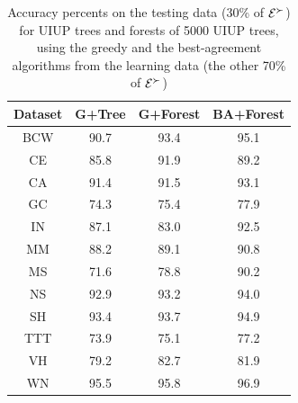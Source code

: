 {
	\begin{table}
	  \centering
	  \begin{tabular}{ |c||c|c|c| }
	    \hline
	    Dataset          & G+Tree & G+Forest & BA+Forest\\
	    \hline \hline
	    BCW              & 90.7   & 93.4     & 95.1 \\ \hline
	    CE               & 85.8   & 91.9     & 89.2 \\ \hline      
	    CA               & 91.4   & 91.5     & 93.1 \\ \hline       
	    GC               & 74.3   & 75.4     & 77.9 \\ \hline     
	    IN               & 87.1   & 83.0     & 92.5 \\ \hline   
	    MM               & 88.2   & 89.1     & 90.8 \\ \hline         
	    MS               & 71.6   & 78.8     & 90.2 \\ \hline 
	    NS               & 92.9   & 93.2     & 94.0 \\ \hline
	    SH               & 93.4   & 93.7     & 94.9 \\ \hline   
	    TTT              & 73.9   & 75.1     & 77.2 \\ \hline 
	    VH               & 79.2   & 82.7     & 81.9 \\ \hline
	    WN               & 95.5   & 95.8     & 96.9 \\ \hline
	  \end{tabular}
	  \caption{Accuracy percents on the testing data (30\% of $\mathcal{E}^\succ$)
						 for UIUP trees and forests of 5000 UIUP trees, 
						 using the greedy and the best-agreement algorithms from the learning 
						 data (the other 70\% of $\mathcal{E}^\succ$)}
	  \label{tbl:forests1}
	\end{table}
}

